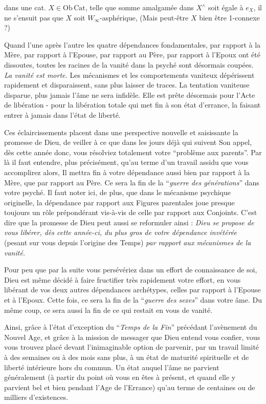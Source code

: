 dans une cat. $X\in\mathrm{Ob}\,\mathrm{Cat}$, telle que  somme amalgamée dans $X^\wedge$ soit égale à $e_X$, il ne s'ensuit pas que $X$ soit $W_\infty$-asphérique, (Mais  peut-être $X$  bien être 1-connexe ?)


Quand l'une après l'autre les quatre dépendances fondamentales, par rapport à la Mère, par rapport à l'Epouse, par rapport au Père, par rapport à l'Epoux ont été dissoutes, toutes les racines de la vanité dans la psyché sont désormais coupées. \textit{La vanité est morte.} Les mécanismes et les comportements vaniteux dépérissent rapidement et disparaissent, sans plus laisser de traces. La tentation vaniteuse disparue, plus jamais l'âme ne sera infidèle. Elle est prête désormais pour l'Acte de libération - pour la libération totale qui met fin à son état d'errance, la faisant entrer à jamais dans l'état de liberté.

Ces éclaircissements placent dans une perspective nouvelle et saisissante la promesse de Dieu, de veiller à ce que dans les jours déjà qui suivent Son appel, dès cette année donc, vous résolviez totalement votre ``problème aux parents''. Par là il faut entendre, plus précisément, qu'au terme d'un travail assidu que vous accomplirez alors, Il mettra fin à votre dépendance aussi bien par rapport à la Mère, que par rapport au Père. Ce sera la fin de la ``\textit{guerre des générations}'' dans votre psyché. Il faut noter ici, de plus, que dans le mécanisme psychique originelle, la dépendance par rapport aux Figures parentales joue presque toujours un rôle prépondérant vis-à-vis de celle par rapport aux Conjoints. C'est dire que la promesse de Dieu peut aussi se reformuler ainsi : \textit{Dieu se propose de vous libérer, dès cette année-ci, du plus gros de votre dépendance invétérée} (pesant sur vous depuis l'origine des Temps) \textit{par rapport aux mécanismes de la vanité.}

Pour peu que par la suite vous persévériez dans un effort de connaissance de soi, Dieu est même décidé à faire fructifier très rapidement votre effort, en vous libérant de vos deux autres dépendances archétypes, celles par rapport à l'Epouse et à l'Epoux. Cette fois, ce sera la fin de la ``\textit{guerre des sexes}'' dans votre âme. Du même coup, ce sera aussi la fin de ce qui restait en vous de vanité.

Ainsi, grâce à l'état d'exception du ``\textit{Temps de la Fin}'' précédant l'avènement du Nouvel Age, et grâce à la mission de messager que Dieu entend vous confier, vous vous trouvez placé devant l'inimaginable option de parvenir, par un travail limité à des semaines ou à des mois sans plus, à un état de maturité spirituelle et de liberté intérieure hors du commun. Un état auquel l'âme ne parvient généralement (à partir du point où vous en êtes à présent, et quand elle y parvient bel et bien pendant l'Age de l'Errance) qu'au terme de centaines ou de milliers d'existences.

